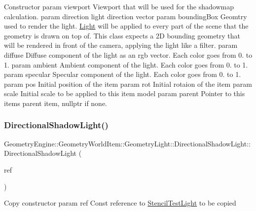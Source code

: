 Constructor param viewport Viewport that will be used for the shadowmap calculation. param direction light direction vector param bounding\+Box Geomtry used to render the light. \mbox{\hyperlink{class_geometry_engine_1_1_geometry_world_item_1_1_geometry_light_1_1_light}{Light}} will be applied to every part of the scene that the geometry is drawn on top of. This class expects a 2D bounding geometry that will be rendered in front of the camera, applying the light like a filter. param diffuse Diffuse component of the light as an rgb vector. Each color goes from 0. to 1. param ambient Ambient component of the light. Each color goes from 0. to 1. param specular Specular component of the light. Each color goes from 0. to 1. param pos Initial position of the item param rot Initial rotaion of the item param scale Initial scale to be applied to this item model param parent Pointer to this items parent item, nullptr if none. \mbox{\label{class_geometry_engine_1_1_geometry_world_item_1_1_geometry_light_1_1_directional_shadow_light_ad01c71215f6c7c3065f9d6dcc0ea195c}} 
\subsubsection{\texorpdfstring{DirectionalShadowLight()}{DirectionalShadowLight()}\hspace{0.1cm}{\footnotesize\ttfamily [2/2]}}
{\footnotesize\ttfamily Geometry\+Engine\+::\+Geometry\+World\+Item\+::\+Geometry\+Light\+::\+Directional\+Shadow\+Light\+::\+Directional\+Shadow\+Light (\begin{DoxyParamCaption}\item[{const \mbox{\hyperlink{class_geometry_engine_1_1_geometry_world_item_1_1_geometry_light_1_1_directional_shadow_light}{Directional\+Shadow\+Light}} \&}]{ref }\end{DoxyParamCaption})\hspace{0.3cm}{\ttfamily [inline]}}

Copy constructor param ref Const reference to \mbox{\hyperlink{class_geometry_engine_1_1_geometry_world_item_1_1_geometry_light_1_1_stencil_test_light}{Stencil\+Test\+Light}} to be copied 

